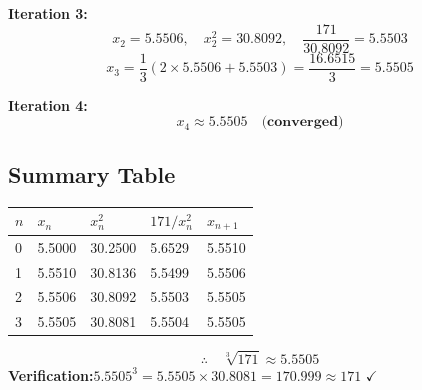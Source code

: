 \documentclass[12pt]{article}
\newcommand{\hcell}[1]{\textbf{\color{white}#1}}
\begin{document}
\medskip
\noindent\textbf{Iteration 3:}
\[
  x_2 = 5.5506, \quad x_2^2 = 30.8092, \quad \frac{171}{30.8092} = 5.5503
\]
\[
  x_3 = \frac{1}{3}(2 \times 5.5506 + 5.5503) = \frac{16.6515}{3} = \mathbf{5.5505}
\]

\medskip
\noindent\textbf{Iteration 4:}
\[
  x_4 \approx 5.5505 \quad \textbf{(converged)}
\]

\subsection*{Summary Table}

\begin{center}
\begin{tabular}{C{0.8cm} C{2.2cm} C{2.2cm} C{2.8cm} C{2.5cm}}
\toprule
{}
\hcell{$n$} & \hcell{$x_n$} & \hcell{$x_n^2$} & \hcell{$171/x_n^2$} & \hcell{$x_{n+1}$} \\
\midrule
{}
0 & 5.5000 & 30.2500 & 5.6529 & 5.5510 \\
1 & 5.5510 & 30.8136 & 5.5499 & 5.5506 \\
2 & 5.5506 & 30.8092 & 5.5503 & 5.5505 \\
3 & 5.5505 & 30.8081 & 5.5504 & 5.5505 \\
\bottomrule
\end{tabular}
\end{center}

\begin{formulabox}
\[
  \therefore\quad \sqrt[3]{171} \approx \mathbf{5.5505}
\]
\textbf{Verification:}\quad $5.5505^3 = 5.5505 \times 30.8081 = 170.999 \approx 171$ \quad $\checkmark$
\end{formulabox}
\end{document}
